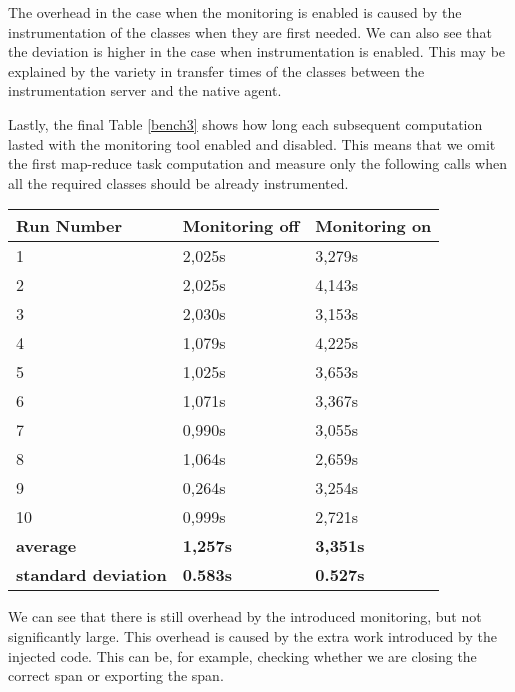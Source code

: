 The overhead in the case when the monitoring is enabled is caused by the instrumentation of the classes when they are first needed. We can also see that the deviation is higher in the case when instrumentation is enabled. This may be explained by the variety in transfer times of the classes between the instrumentation server and the native agent.

Lastly, the final Table \ref{bench3} shows how long each subsequent computation lasted with the monitoring tool enabled and disabled. This means that we omit the first map-reduce task computation and measure only the following calls when all the required classes should be already instrumented. 
\begin{center}
	\begin{tabular}{ l l l }
		\hline
		Run Number & Monitoring off & Monitoring on \\ \hline
1&	2,025s&	3,279s \\ 
2&	2,025s&	4,143s \\
3&	2,030s	&3,153s \\
4&	1,079s&	4,225s \\
5&	1,025s&	3,653s \\
6&	1,071s	&3,367s \\
7	&0,990s&	3,055s \\
8&	1,064s	&2,659s \\
9&	0,264s&	3,254s \\
10&	0,999s&	2,721s \\

\hline  
\textbf{average} & \textbf{1,257s} & \textbf{3,351s} \\
\textbf{standard deviation} & \textbf{0.583s} & \textbf{0.527s} \\
\end{tabular}
\label{bench3}

\end{center}

We can see that there is still overhead by the introduced monitoring, but not significantly large. This overhead is caused by the extra work introduced by the injected code. This can be, for example, checking whether we are closing the correct span or exporting the span.

